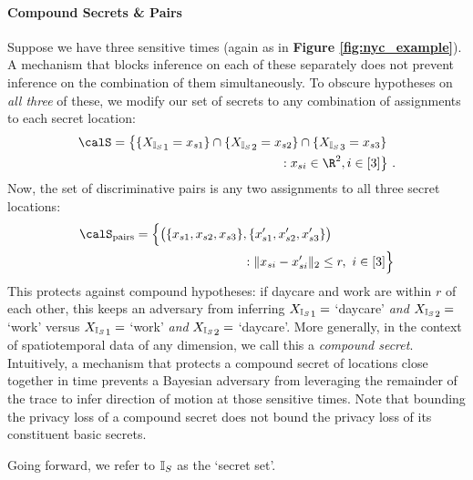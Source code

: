 \paragraph{Compound Secrets \& Pairs} 
Suppose we have three sensitive times (again as in \textbf{Figure \ref{fig:nyc_example}}). A mechanism that blocks inference on each of these separately does not prevent inference on the combination of them simultaneously. To obscure hypotheses on \emph{all three} of these, we modify our set of secrets to any combination of assignments to each secret location: 
\begin{align*}
	\calS = \big\{ \{\Xs_1 = x_{s1}\} \cap \{\Xs_2 = x_{s2}\} \cap \{\Xs_3 = x_{s3} &\} \\
	: x_{si} \in \R^2, i \in [3] &\big\} \ .
\end{align*} 
Now, the set of discriminative pairs is any two assignments to all three secret locations: 
\begin{align*}
	\Spairs = \Big\{\big( \{x_{s1}, x_{s2}, x_{s3}\} &, \{x_{s1}', x_{s2}', x_{s3}'\}\big) \\
	&: \| x_{si} - x_{si}' \|_2 \leq r, \ i \in [3] \Big\}
\end{align*}
This protects against compound hypotheses: if daycare and work are within $r$ of each other, this keeps an adversary from inferring ${X_{\mathbb{I}_S}}_1 = $ `daycare' \emph{and} ${X_{\mathbb{I}_S}}_2 = $ `work' versus ${X_{\mathbb{I}_S}}_1 = $ `work' \emph{and} ${X_{\mathbb{I}_S}}_2 = $ `daycare'. More generally, in the context of spatiotemporal data of any dimension, we call this a \emph{compound secret}. Intuitively, a mechanism that protects a compound secret of locations close together in time prevents a Bayesian adversary from leveraging the remainder of the trace to infer direction of motion at those sensitive times. Note that bounding the privacy loss of a compound secret does not bound the privacy loss of its constituent basic secrets.

Going forward, we refer to ${\mathbb{I}_S}$ as the `secret set'. 

